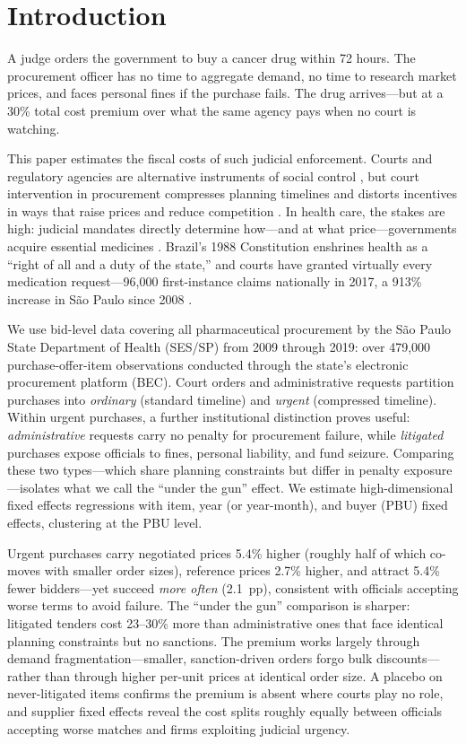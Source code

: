 \section{Introduction}
\label{sec:introduction}

A judge orders the government to buy a cancer drug within 72 hours. The procurement officer has no time to aggregate demand, no time to research market prices, and faces personal fines if the purchase fails. The drug arrives---but at a 30\% total cost premium over what the same agency pays when no court is watching.

This paper estimates the fiscal costs of such judicial enforcement. Courts and regulatory agencies are alternative instruments of social control \citep{glaeser2003rise}, but court intervention in procurement compresses planning timelines and distorts incentives in ways that raise prices and reduce competition \citep{coviello2018court}. In health care, the stakes are high: judicial mandates directly determine how---and at what price---governments acquire essential medicines \citep{wang2015right, ferraz2009right}. Brazil's 1988 Constitution enshrines health as a ``right of all and a duty of the state,'' and courts have granted virtually every medication request---96,000 first-instance claims nationally in 2017, a 913\% increase in S\~ao Paulo since 2008 \citep{cnj2019judicializacao}.

We use bid-level data covering all pharmaceutical procurement by the S\~ao Paulo State Department of Health (SES/SP) from 2009 through 2019: over 479,000 purchase-offer-item observations conducted through the state's electronic procurement platform (BEC). Court orders and administrative requests partition purchases into \textit{ordinary} (standard timeline) and \textit{urgent} (compressed timeline). Within urgent purchases, a further institutional distinction proves useful: \textit{administrative} requests carry no penalty for procurement failure, while \textit{litigated} purchases expose officials to fines, personal liability, and fund seizure. Comparing these two types---which share planning constraints but differ in penalty exposure---isolates what we call the ``under the gun'' effect. We estimate high-dimensional fixed effects regressions with item, year (or year-month), and buyer (PBU) fixed effects, clustering at the PBU level.

Urgent purchases carry negotiated prices 5.4\% higher (roughly half of which co-moves with smaller order sizes), reference prices 2.7\% higher, and attract 5.4\% fewer bidders---yet succeed \textit{more often} (2.1~pp), consistent with officials accepting worse terms to avoid failure. The ``under the gun'' comparison is sharper: litigated tenders cost 23--30\% more than administrative ones that face identical planning constraints but no sanctions. The premium works largely through demand fragmentation---smaller, sanction-driven orders forgo bulk discounts---rather than through higher per-unit prices at identical order size. A placebo on never-litigated items confirms the premium is absent where courts play no role, and supplier fixed effects reveal the cost splits roughly equally between officials accepting worse matches and firms exploiting judicial urgency.

